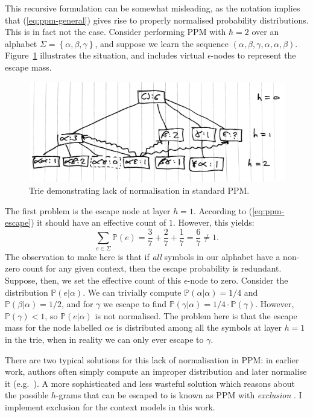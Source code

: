 \documentclass[12pt,a4paper,twoside,openright]{report}
\newcommand{\set}[1]{ \left\{ #1 \right\} }
\begin{document}
This recursive formulation can be somewhat misleading, as the notation implies
that (\ref{eq:ppm-general}) gives rise to properly normalised probability
distributions.  This is in fact not the case. Consider performing PPM with
$\hbar = 2$ over an alphabet $\Sigma = \set{\alpha,\beta,\gamma}$, and suppose
we learn the sequence $(\alpha,\beta,\gamma,\alpha,\alpha,\beta)$.
Figure~\ref{fig:bad-ppm-trie} illustrates the situation, and includes virtual
$\epsilon$-nodes to represent the escape mass.

\begin{figure}[H]
\centering
\includegraphics[width=400pt]{figs/problematic_trie_tmp.jpg}
\caption{Trie demonstrating lack of normalisation in standard PPM.}
\label{fig:bad-ppm-trie}
\end{figure}

The first problem is the escape node at layer $h = 1$. According to
(\ref{eq:ppm-escape}) it should have an effective count of $1$. However, this
yields:
$$ \sum_{e \in \Sigma} \mathbb{P}(e) = \frac{3}{7} + \frac{2}{7} + \frac{1}{7} =
\frac{6}{7} \neq 1. $$
The observation to make here is that if \emph{all} symbols in our alphabet have
a non-zero count for any given context, then the escape probability is
redundant. Suppose, then, we set the effective count of this $\epsilon$-node to
zero. Consider the distribution $\mathbb{P}(e|\alpha)$. We can trivially compute
$\mathbb{P}(\alpha|\alpha) = 1/4$ and $\mathbb{P}(\beta|\alpha) = 1/2$, and for
$\gamma$ we escape to find $\mathbb{P}(\gamma|\alpha) = 1/4 \cdot
\mathbb{P}(\gamma)$. However, $\mathbb{P}(\gamma) < 1$, so
$\mathbb{P}(e|\alpha)$ is not normalised. The problem here is that the escape
mass for the node labelled $\alpha\epsilon$ is distributed among all the symbols
at layer $h = 1$ in the trie, when in reality we can only ever escape to
$\gamma$.

There are two typical solutions for this lack of normalisation in PPM: in
earlier work, authors often simply compute an improper distribution and later
normalise it (e.g.\ \cite{conklin1990prediction}). A more sophisticated and less
wasteful solution which reasons about the possible $h$-grams that can be escaped
to is known as PPM with \emph{exclusion} \cite{pearce2004improved}. I implement
exclusion for the context models in this work.
\end{document}
